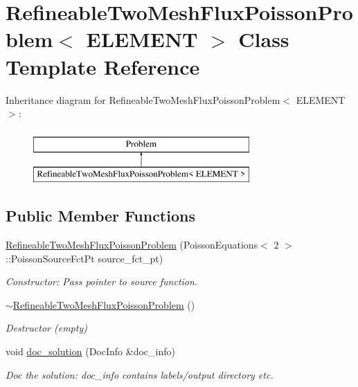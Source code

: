 \hypertarget{classRefineableTwoMeshFluxPoissonProblem}{}\section{Refineable\+Two\+Mesh\+Flux\+Poisson\+Problem$<$ E\+L\+E\+M\+E\+NT $>$ Class Template Reference}
\label{classRefineableTwoMeshFluxPoissonProblem}
Inheritance diagram for Refineable\+Two\+Mesh\+Flux\+Poisson\+Problem$<$ E\+L\+E\+M\+E\+NT $>$\+:\begin{figure}[H]
\begin{center}
\leavevmode
\includegraphics[height=2.000000cm]{classRefineableTwoMeshFluxPoissonProblem}
\end{center}
\end{figure}
\subsection*{Public Member Functions}
\begin{DoxyCompactItemize}
\item 
\hyperlink{classRefineableTwoMeshFluxPoissonProblem_a6568980564c4e39544b1c2bcb71cf3b6}{Refineable\+Two\+Mesh\+Flux\+Poisson\+Problem} (Poisson\+Equations$<$ 2 $>$\+::Poisson\+Source\+Fct\+Pt source\+\_\+fct\+\_\+pt)
\begin{DoxyCompactList}\small\item\em Constructor\+: Pass pointer to source function. \end{DoxyCompactList}\item 
\hyperlink{classRefineableTwoMeshFluxPoissonProblem_a6b1f154c77ea0c415bf171764d34302f}{$\sim$\+Refineable\+Two\+Mesh\+Flux\+Poisson\+Problem} ()
\begin{DoxyCompactList}\small\item\em Destructor (empty) \end{DoxyCompactList}\item 
void \hyperlink{classRefineableTwoMeshFluxPoissonProblem_ad9d4a3b5856839fa95f60968fabe3493}{doc\+\_\+solution} (Doc\+Info \&doc\+\_\+info)
\begin{DoxyCompactList}\small\item\em Doc the solution\+: doc\+\_\+info contains labels/output directory etc. \end{DoxyCompactList}\end{DoxyCompactItemize}
